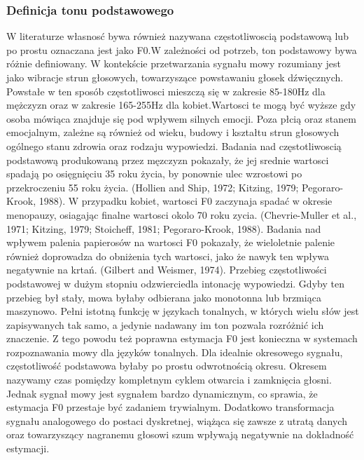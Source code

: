 \documentclass[a4paper,12 pt]{article}
\begin{document}
\subsubsection{Definicja tonu podstawowego}
W literaturze własnosć bywa również nazywana częstotliwoscią podstawową lub po prostu oznaczana jest jako F0.W zależności od potrzeb, ton podstawowy bywa różnie definiowany. W kontekście przetwarzania sygnału  mowy rozumiany jest jako wibracje strun głosowych, towarzyszące powstawaniu głosek dźwięcznych. Powstałe w ten sposób częstotliwosci mieszczą się w zakresie 85-180Hz dla mężczyzn oraz w zakresie 165-255Hz dla kobiet.Wartosci te mogą być wyższe gdy osoba mówiąca znajduje się pod wpływem silnych emocji. Poza płcią oraz stanem emocjalnym, zależne są również od wieku, budowy i kształtu strun głosowych ogólnego stanu zdrowia oraz rodzaju wypowiedzi. Badania nad częstotliwoscią podstawową produkowaną przez męzczyzn pokazały, że jej srednie wartosci spadają po osięgnięciu 35 roku życia, by ponownie ulec wzrostowi po przekroczeniu 55 roku życia.  (Hollien and Ship, 1972; Kitzing, 1979; Pegoraro-Krook,
1988). W przypadku kobiet, wartosci F0 zaczynaja spadać w okresie menopauzy, osiagając finalne wartosci okolo 70 roku zycia. (Chevrie-Muller et al., 1971; Kitzing,
1979; Stoicheff, 1981; Pegoraro-Krook, 1988). Badania nad wpływem palenia papierosów na wartosci F0 pokazały, że wieloletnie palenie również doprowadza do obniżenia tych wartosci, jako że nawyk ten wpływa negatywnie na krtań. (Gilbert and Weismer, 1974).
Przebieg częstotliwości podstawowej w dużym stopniu odzwierciedla intonację wypowiedzi. Gdyby ten przebieg był stały, mowa byłaby odbierana jako monotonna lub brzmiąca maszynowo.  Pełni istotną funkcję w językach tonalnych, w których wielu słów jest zapisywanych tak samo, a jedynie nadawany im ton pozwala rozróżnić ich znaczenie. Z tego powodu też poprawna estymacja F0 jest konieczna w systemach rozpoznawania mowy dla języków tonalnych.
Dla idealnie okresowego sygnału, częstotliwość podstawowa byłaby po prostu odwrotnością okresu. Okresem nazywamy czas pomiędzy kompletnym cyklem otwarcia i zamknięcia głosni. Jednak sygnał mowy jest sygnałem bardzo dynamicznym, co sprawia, że estymacja F0 przestaje być zadaniem trywialnym. Dodatkowo transformacja sygnału analogowego do postaci dyskretnej, wiążąca się zawsze z utratą danych oraz towarzyszący nagranemu głosowi szum wpływają negatywnie na dokładność estymacji. 
\end{document}
